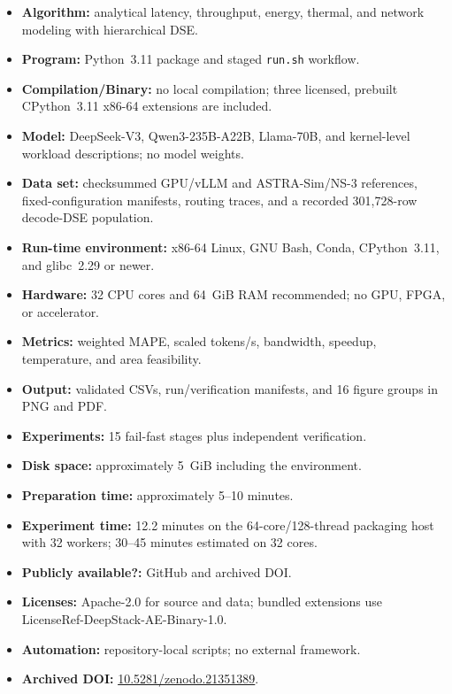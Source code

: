 \documentclass[10pt,twocolumn]{article}
\newcommand{\code}[1]{\texttt{#1}}
\begin{document}
{\small
\begin{itemize}
  \item {\bf Algorithm:} analytical latency, throughput, energy, thermal, and
        network modeling with hierarchical DSE.
  \item {\bf Program:} Python~3.11 package and staged \code{run.sh} workflow.
  \item {\bf Compilation/Binary:} no local compilation; three licensed,
        prebuilt CPython~3.11 x86-64 extensions are included.
  \item {\bf Model:} DeepSeek-V3, Qwen3-235B-A22B, Llama-70B, and
        kernel-level workload descriptions; no model weights.
  \item {\bf Data set:} checksummed GPU/vLLM and ASTRA-Sim/NS-3 references,
        fixed-configuration manifests, routing traces, and a recorded
        301{,}728-row decode-DSE population.
  \item {\bf Run-time environment:} x86-64 Linux, GNU Bash, Conda,
        CPython~3.11, and glibc~2.29 or newer.
  \item {\bf Hardware:} 32 CPU cores and 64~GiB RAM recommended; no GPU,
        FPGA, or accelerator.
  \item {\bf Metrics:} weighted MAPE, scaled tokens/s, bandwidth, speedup,
        temperature, and area feasibility.
  \item {\bf Output:} validated CSVs, run/verification manifests, and 16
        figure groups in PNG and PDF.
  \item {\bf Experiments:} 15 fail-fast stages plus independent verification.
  \item {\bf Disk space:} approximately 5~GiB including the environment.
  \item {\bf Preparation time:} approximately 5--10 minutes.
  \item {\bf Experiment time:} 12.2 minutes on the 64-core/128-thread
        packaging host with 32 workers; 30--45 minutes estimated on 32 cores.
  \item {\bf Publicly available?:} GitHub and archived DOI.
  \item {\bf Licenses:} Apache-2.0 for source and data; bundled extensions use
        LicenseRef-DeepStack-AE-Binary-1.0.
  \item {\bf Automation:} repository-local scripts; no external framework.
  \item {\bf Archived DOI:}
        \href{https://doi.org/10.5281/zenodo.21351389}{10.5281/zenodo.21351389}.
\end{itemize}
}
\end{document}
